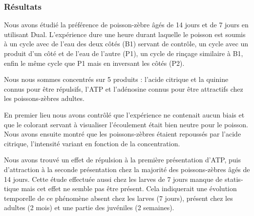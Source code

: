 \begin{otherlanguage}{french}
\subsubsection*{Résultats}
Nous avons étudié la préférence de poisson-zèbre âgés de 14 jours et de 7 jours en utilisant Dual. L'expérience dure une heure durant laquelle le poisson est soumis à un cycle avec de l'eau des deux côtés (B1) servant de contrôle, un cycle avec un produit d'un côté et de l'eau de l'autre (P1), un cycle de rinçage similaire à B1, enfin le même cycle que P1 mais en inversant les côtés (P2).

Nous nous sommes concentrés sur 5 produits : l'acide citrique et la quinine connus pour être répulsifs, l'ATP et l'adénosine connus pour être attractifs chez les poissons-zèbres adultes.

En premier lieu nous avons contrôlé que l'expérience ne contenait aucun biais et que le colorant servant à visualiser l'écoulement était bien neutre pour le poisson. Nous avons ensuite montré que les poissons-zèbres étaient repoussés par l'acide citrique, l'intensité variant en fonction de la concentration.

Nous avons trouvé un effet de répulsion à la première présentation d'ATP, puis d'attraction à la seconde présentation chez la majorité des poissons-zèbres âgés de 14 jours. Cette étude effectuée aussi chez les larves de 7 jours manque de statistique mais cet effet ne semble pas être présent. Cela indiquerait une évolution temporelle de ce phénomène absent chez les larves (7 jours), présent chez les adultes (2 mois) et une partie des juvéniles (2 semaines).
\end{otherlanguage}
